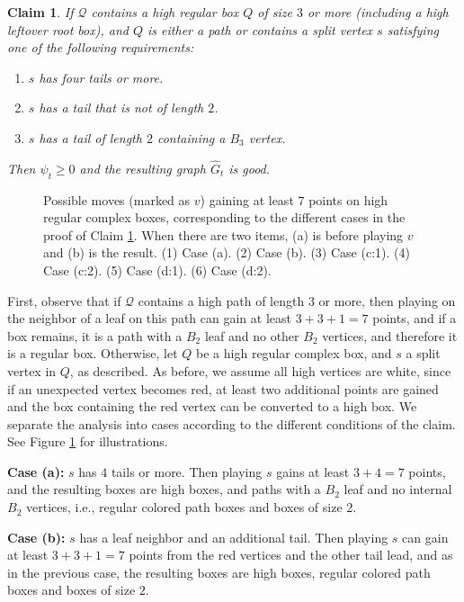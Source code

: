 \documentclass[11pt]{article}
\def\Proof{\par\noindent{\bf Proof:~}}
\def\dnsitem{\vspace{-7pt}\item}
\newtheorem{claim}[theorem]{Claim}
\theoremstyle{definition}
\begin{document}
\begin{claim}
\label{claim:dom_split_7}
If $\mathcal{Q}$ contains a high regular box $Q$ of size $3$ or more (including a high leftover root box), and $Q$ is either a path or contains a split vertex $s$ satisfying one of the following requirements:
\begin{enumerate}
	\dnsitem 
	\label{claim:dom_split_7:4tails}
	$s$ has four tails or more.
	\dnsitem 
	\label{claim:dom_split_7:not2}
	$s$ has a tail that is not of length $2$.
	\dnsitem
	\label{claim:dom_split_7:b3}
	$s$ has a tail of length $2$ containing a $B_3$ vertex.
\end{enumerate}
Then $\psi_t \geq 0$ and the resulting graph $\hat{G}_t$ is good.
\end{claim}
\begin{figure}[thbp]
  \caption{\sf Possible moves (marked as $v$) gaining at least $7$ points on high regular complex boxes, corresponding to the different cases in the proof of Claim \ref{claim:dom_split_7}.
		When there are two items, (a) is before playing $v$ and (b) is the result.
		(1) Case (a).
		(2) Case (b). 
		(3) Case (c:1). 
		(4) Case (c:2). 
		(5) Case (d:1). 
		(6) Case (d:2).} 
  \medskip
  \centering
  \label{fig:dom_clean}
\end{figure}
\Proof
First, observe that if $\mathcal{Q}$ contains a high path of length $3$ or more, then playing on the neighbor of a leaf on this path can gain at least $3 + 3 + 1 = 7$ points, 
and if a box remains, it is a path with a $B_2$ leaf and no other $B_2$ vertices, and therefore it is a regular box. 
Otherwise, let $Q$ be a high regular complex box, and $s$ a split vertex in $Q$, as described.
As before, we assume all high vertices are white, since if an unexpected vertex becomes red, at least two additional points are gained and the box containing the red vertex can be converted to a high box.
We separate the analysis into cases according to the different conditions of the claim.
See Figure \ref{fig:dom_clean} for illustrations.

\bigskip
\par\noindent
{\bf Case (a):}
$s$ has $4$ tails or more.
Then playing $s$ gains at least $3 + 4 = 7$ points, and the resulting boxes are high boxes, and paths with a $B_2$ leaf and no internal $B_2$ vertices, i.e., regular colored path boxes and boxes of size $2$.

\smallskip
\par\noindent
{\bf Case (b):}
$s$ has a leaf neighbor and an additional tail.
Then playing $s$ can gain at least $3 + 3 + 1 = 7$ points from the red vertices and the other tail lead, and as in the previous case, the resulting boxes are high boxes, 
regular colored path boxes and boxes of size $2$.
\end{document}
